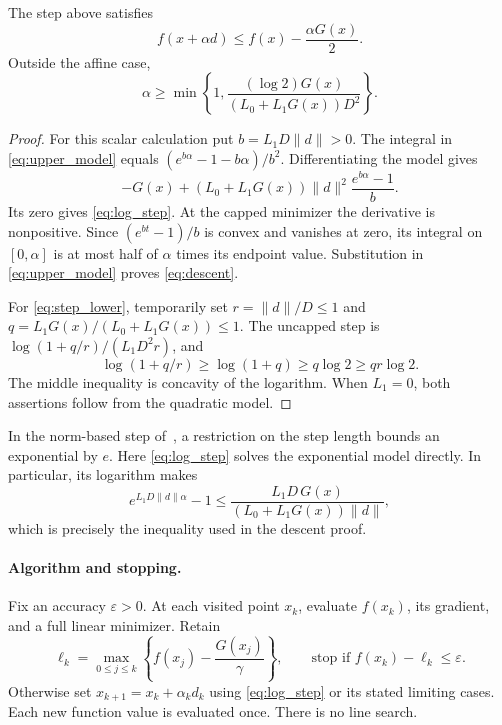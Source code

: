 \begin{lemma}[Descent]\label{lem:descent}
The step above satisfies
\begin{equation}\label{eq:descent}
 f(x+\alpha d)\le f(x)-\frac{\alpha G(x)}2.
\end{equation}
Outside the affine case,
\begin{equation}\label{eq:step_lower}
 \alpha\ge
 \min\left\{1,
   \frac{(\log2)G(x)}{(L_0+L_1G(x))D^2}\right\}.
\end{equation}
\end{lemma}
\begin{proof}
For this scalar calculation put $b=L_1D\|d\|>0$.
The integral in \eqref{eq:upper_model} equals
$(e^{b\alpha}-1-b\alpha)/b^2$.
Differentiating the model gives
\[
 -G(x)+(L_0+L_1G(x))\|d\|^2
             \frac{e^{b\alpha}-1}{b}.
\]
Its zero gives \eqref{eq:log_step}. At the capped minimizer
the derivative is nonpositive. Since $(e^{bt}-1)/b$ is convex
and vanishes at zero, its integral on $[0,\alpha]$ is at most
half of $\alpha$ times its endpoint value. Substitution in
\eqref{eq:upper_model} proves \eqref{eq:descent}.

For \eqref{eq:step_lower}, temporarily set
$r=\|d\|/D\le1$ and
$q=L_1G(x)/(L_0+L_1G(x))\le1$. The uncapped step is
$\log(1+q/r)/(L_1D^2r)$, and
\[
 \log(1+q/r)\ge\log(1+q)\ge q\log2\ge qr\log2.
\]
The middle inequality is concavity of the logarithm.
When $L_1=0$, both assertions follow from the quadratic model.
\end{proof}

In the norm-based step of~\cite{vyguzov}, a restriction on the
step length bounds an exponential by $e$.
Here \eqref{eq:log_step} solves the exponential model directly.
In particular, its logarithm makes
\[
 e^{L_1D\|d\|\alpha}-1
 \le\frac{L_1D\,G(x)}{(L_0+L_1G(x))\|d\|},
\]
which is precisely the inequality used in the descent proof.

\paragraph{Algorithm and stopping.}
Fix an accuracy $\varepsilon>0$.
At each visited point $x_k$, evaluate $f(x_k)$, its gradient,
and a full linear minimizer. Retain
\begin{equation}\label{eq:stop}
 \ell_k=\max_{0\le j\le k}
        \left\{f(x_j)-\frac{G(x_j)}{\gamma}\right\},
 \qquad \text{stop if } f(x_k)-\ell_k\le\varepsilon.
\end{equation}
Otherwise set $x_{k+1}=x_k+\alpha_kd_k$ using \eqref{eq:log_step}
or its stated limiting cases. Each new function value is evaluated
once. There is no line search.
